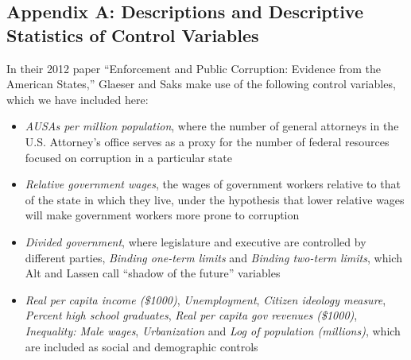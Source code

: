 \documentclass{jopsubmission}
\providecommand{\tightlist}{%
  \setlength{\itemsep}{0pt}\setlength{\parskip}{0pt}}
\begin{document}
\newpage

\subsection{Appendix A: Descriptions and Descriptive Statistics of
Control
Variables}\label{appendix-a-descriptions-and-descriptive-statistics-of-control-variables}

In their 2012 paper ``Enforcement and Public Corruption: Evidence from
the American States,'' Glaeser and Saks make use of the following
control variables, which we have included here:

\begin{itemize}
\tightlist
\item
  \emph{AUSAs per million population}, where the number of general
  attorneys in the U.S. Attorney's office serves as a proxy for the
  number of federal resources focused on corruption in a particular
  state
\item
  \emph{Relative government wages}, the wages of government workers
  relative to that of the state in which they live, under the hypothesis
  that lower relative wages will make government workers more prone to
  corruption
\item
  \emph{Divided government}, where legislature and executive are
  controlled by different parties, \emph{Binding one-term limits} and
  \emph{Binding two-term limits}, which Alt and Lassen call ``shadow of
  the future'' variables
\item
  \emph{Real per capita income (\$1000)}, \emph{Unemployment},
  \emph{Citizen ideology measure}, \emph{Percent high school graduates},
  \emph{Real per capita gov revenues (\$1000)}, \emph{Inequality: Male
  wages}, \emph{Urbanization} and \emph{Log of population (millions)},
  which are included as social and demographic controls
\end{itemize}
\end{document}
